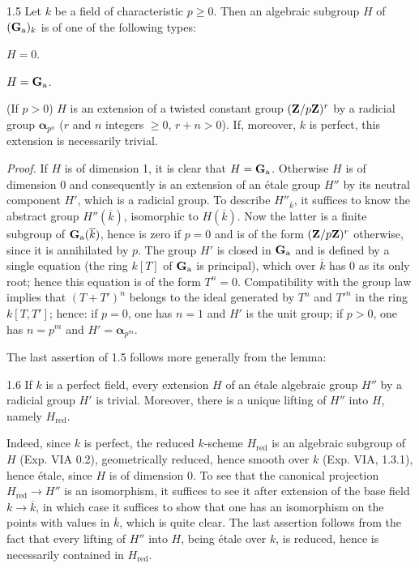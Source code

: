 \begin{proposition}{1.5}\label{XVII.1.5}
Let $k$ be a field of characteristic $p\geq0$. Then an algebraic subgroup $H$ of $(\mathbf{G}_{\mathrm{a}})_k$ is of one of the following types:
\begin{enumeratei}
\item $H=0$.
\item $H=\mathbf{G}_{\mathrm{a}}$.
\item (If $p>0$) $H$ is an extension of a twisted constant group $(\mathbf{Z}/p\mathbf{Z})^r$ by a radicial group $\boldsymbol\alpha_{p^n}$ ($r$ and $n$ integers $\geq0$, $r+n>0$). If, moreover, $k$ is perfect, this extension is necessarily trivial.
\end{enumeratei}
\end{proposition}

\noindent\emph{Proof.} If $H$ is of dimension 1, it is clear that $H=\mathbf{G}_{\mathrm{a}}$. Otherwise $H$ is of dimension 0 and consequently is an extension of an étale group $H''$ by its neutral component $H'$, which is a radicial group. To describe $H''_{\overline k}$, it suffices to know the abstract group $H''(\overline k)$, isomorphic to $H(\overline k)$. Now the latter is a finite subgroup of $\mathbf{G}_{\mathrm{a}}(\overline k)$, hence is zero if $p=0$ and is of the form $(\mathbf{Z}/p\mathbf{Z})^r$ otherwise, since it is annihilated by $p$. The group $H'$ is closed in $\mathbf{G}_{\mathrm{a}}$ and is defined by a single equation (the ring $k[T]$ of $\mathbf{G}_{\mathrm{a}}$ is principal), which over $\overline k$ has 0 as its only root; hence this equation is of the form $T^n=0$. Compatibility with the group law implies that $(T+T')^n$ belongs to the ideal generated by $T^n$ and $T'^n$ in the ring $k[T,T']$; hence: if $p=0$, one has $n=1$ and $H'$ is the unit group; if $p>0$, one has $n=p^m$ and $H'=\boldsymbol\alpha_{p^m}$.

The last assertion of 1.5 follows more generally from the lemma:
\begin{lemma}{1.6}\label{XVII.1.6}
If $k$ is a perfect field, every extension $H$ of an étale algebraic group $H''$ by a radicial group $H'$ is trivial. Moreover, there is a unique lifting of $H''$ into $H$, namely $H_{\mathrm{red}}$.
\end{lemma}
Indeed, since $k$ is perfect, the reduced $k$-scheme $H_{\mathrm{red}}$ is an algebraic subgroup of $H$ (Exp. VIA 0.2), geometrically reduced, hence smooth over $k$ (Exp. VIA, 1.3.1), hence étale, since $H$ is of dimension 0. To see that the canonical projection $H_{\mathrm{red}}\to H''$ is an isomorphism, it suffices to see it after extension of the base field $k\to\overline k$, in which case it suffices to show that one has an isomorphism on the points with values in $\overline k$, which is quite clear. The last assertion follows from the fact that every lifting of $H''$ into $H$, being étale over $k$, is reduced, hence is necessarily contained in $H_{\mathrm{red}}$.

